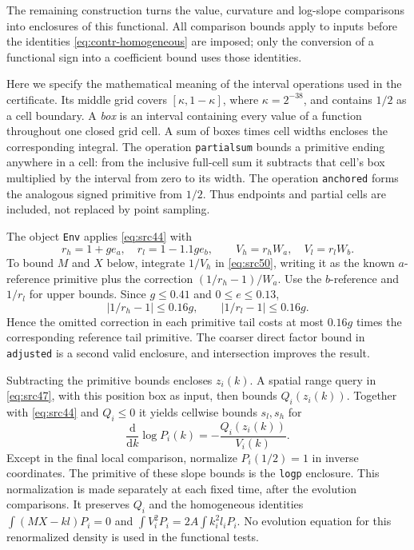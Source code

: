 \documentclass[11pt,a4paper]{article}
\numberwithin{equation}{section}
\theoremstyle{definition}
\theoremstyle{remark}
\newcommand{\dd}{\mathrm d}
\begin{document}
The remaining construction turns the value, curvature and log-slope
comparisons into enclosures of this functional.  All comparison bounds
apply to inputs before the identities \eqref{eq:contr-homogeneous} are
imposed; only the conversion of a functional sign into a coefficient
bound uses those identities.

Here we specify the mathematical meaning of the interval operations
used in the certificate.  Its middle grid covers
$[\kappa,1-\kappa]$, where $\kappa=2^{-38}$, and contains $1/2$ as
a cell boundary.  A \emph{box} is an interval containing every value
of a function throughout one closed grid cell.  A sum of boxes times
cell widths encloses the corresponding integral.
The operation \texttt{partialsum} bounds a primitive ending anywhere
in a cell: from the inclusive full-cell sum it subtracts that cell's
box multiplied by the interval from zero to its width.  The operation
\texttt{anchored} forms the analogous signed primitive from $1/2$.
Thus endpoints and partial cells are included, not replaced by point
sampling.

The object \texttt{Env} applies \eqref{eq:src44} with
\[
 r_h=1+ge_a,\quad r_l=1-1.1ge_b,\qquad
 V_h=r_hW_a,\quad V_l=r_lW_b.
\]
To bound $M$ and $X$ below, integrate $1/V_h$ in
\eqref{eq:src50}, writing it as the known $a$-reference primitive
plus the correction $(1/r_h-1)/W_a$.  Use the $b$-reference and
$1/r_l$ for upper bounds.  Since $g\le0.41$ and $0\le e\le0.13$,
\[
 |1/r_h-1|\le0.16g,\qquad |1/r_l-1|\le0.16g.
\]
Hence the omitted correction in each primitive tail costs at most
$0.16g$ times the corresponding reference tail primitive.  The
coarser direct factor bound in \texttt{adjusted} is a second valid
enclosure, and intersection improves the result.

Subtracting the primitive bounds encloses $z_i(k)$.  A spatial range
query in \eqref{eq:src47}, with this position box as input, then
bounds $Q_i(z_i(k))$.  Together with \eqref{eq:src44} and $Q_i\le0$
it yields cellwise bounds $s_l,s_h$ for
\[
 \frac{\dd}{\dd k}\log P_i(k)
       =-\frac{Q_i(z_i(k))}{V_i(k)}.
\]
Except in the final local comparison, normalize $P_i(1/2)=1$ in
inverse coordinates.  The primitive of these slope bounds is the
\texttt{logp} enclosure.  This normalization is made separately
at each fixed time, after the evolution comparisons.  It preserves
$Q_i$ and the homogeneous identities
$\int(MX-kl)P_i=0$ and
$\int V_i^2P_i=2A\int k_i^2l_iP_i$.
No evolution equation for this renormalized density is used in
the functional tests.
\end{document}
